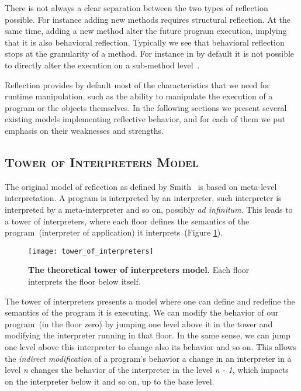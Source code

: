 There is not always a clear separation between the two types of reflection possible.
For instance adding new methods requires structural reflection.
At the same time, adding a new method alter the future program execution, implying that it is also behavioral reflection.
Typically we see that behavioral reflection stops at the granularity of a method.
For instance in \PH by default it is not possible to directly alter the execution on a sub-method level~\cite{Denk06a}.

Reflection provides by default most of the characteristics that we need for runtime manipulation, such as the ability to manipulate the execution of a program or the objects themselves.
In the following sections we present several existing models implementing reflective behavior, and for each of them we put emphasis on their weaknesses and strengths.

\subsection*{\textsc{Tower of Interpreters Model}}

The original model of reflection as defined by Smith~\cite{Smit82c} is based on meta-level interpretation. A program is interpreted by an interpreter, such interpreter is interpreted by a meta-interpreter and so on, possibly \emph{ad infinitum}. This leads to a tower of interpreters, where each floor defines the semantics of the program~(interpreter of application) it interprets~(Figure \ref{fig:tower_of_interpreters}).

\begin{figure}[ht]
\begin{center}
\texttt{[image: tower\_of\_interpreters]}
\caption{\textbf{The theoretical tower of interpreters model.} Each floor interprets the floor below itself.\label{fig:tower_of_interpreters}
 }
\end{center}
\end{figure}

The tower of interpreters presents a model where one can define and redefine the semantics of the program it is executing. We can modify the behavior of our program~(in the floor zero) by jumping one level above it in the tower and modifying the interpreter running in that floor. In the same sense, we can jump one level above this interpreter to change also its behavior and so on. This allows the \emph{indirect modification} of a program's behavior \ie a change in an interpreter in a level \emph{n} changes the behavior of the interpreter in the level \emph{n - 1}, which impacts on the interpreter below it and so on, up to the base level.

